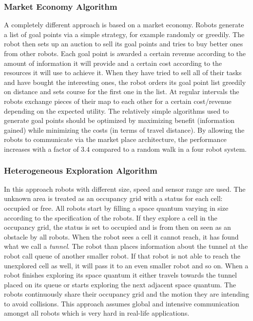  \subsubsection{Market Economy Algorithm}
  A completely different approach is based on a market economy.
  Robots generate a list of goal points via a simple strategy, for example randomly or greedily.
  The robot then sets up an auction to sell its goal points and tries to buy better ones from other robots.
  Each goal point is awarded a certain revenue according to the amount of information it will provide and a certain cost according to the resources it will use to achieve it.
  When they have tried to sell all of their tasks and have bought the interesting ones, the robot orders its goal point list greedily on distance and sets course for the first one in the list.
  At regular intervals the robots exchange pieces of their map to each other for a certain cost/revenue depending on the expected utility.
  The relatively simple algorithms used to generate goal points should be optimized by maximizing benefit (information gained) while minimizing the costs (in terms of travel distance).
  By allowing the robots to communicate via the market place architecture, the performance increases with a factor of $3.4$ compared to a random walk in a four robot system. \cite{zlot2002multi}

  \subsubsection{Heterogeneous Exploration Algorithm}
  In this approach robots with different size, speed and sensor range are used.
  The unknown area is treated as an occupancy grid with a status for each cell: occupied or free.
  All robots start by filling a space quantum varying in size according to the specification of the robots.
  If they explore a cell in the occupancy grid, the status is set to occupied and is from then on seen as an obstacle by all robots.
  When the robot sees a cell it cannot reach, it has found what we call a \emph{tunnel}.
  The robot than places information about the tunnel at the robot call queue of another smaller robot.
  If that robot is not able to reach the unexplored cell as well, it will pass it to an even smaller robot and so on.
  When a robot finishes exploring its space quantum it either travels towards the tunnel placed on its queue or starts exploring the next adjacent space quantum.
  The robots continuously share their occupancy grid and the motion they are intending to avoid collisions.
  This approach assumes global and intensive communication amongst all robots which is very hard in real-life applications. \cite{singh1993map}

